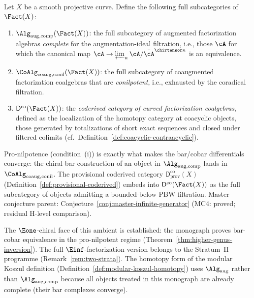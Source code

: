 \begin{definition}
\label{def:completed-chiral-ambient}
Let $X$ be a smooth projective curve.  Define the following full
subcategories of $\Fact(X)$:
\begin{enumerate}[label=\textup{(\roman*)}]
\item $\Alg_{\mathrm{aug,comp}}(\Fact(X))$: the full subcategory of
  augmented factorization algebras \emph{complete} for the
  augmentation-ideal filtration, i.e., those $\cA$ for which the
  canonical map
  $\cA \to \varprojlim_n \cA / \bar{\cA}^{\chirtensor n}$
  is an equivalence.
\item $\CoAlg_{\mathrm{coaug,conil}}(\Fact(X))$: the full subcategory
  of coaugmented factorization coalgebras that are \emph{conilpotent},
  i.e., exhausted by the coradical filtration.
\item $\mathsf{D}^{\mathrm{co}}(\Fact(X))$: the \emph{coderived
  category of curved factorization coalgebras}, defined as the
  localization of the homotopy category at coacyclic objects, those
  generated by totalizations of short exact sequences and closed under
  filtered colimits (cf.\
  Definition~\ref{def:coacyclic-contraacyclic}).
\end{enumerate}
Pro-nilpotence (condition~(i)) is exactly what makes the bar/cobar
differentials converge: the chiral bar construction of an object in
$\Alg_{\mathrm{aug,comp}}$ lands in $\CoAlg_{\mathrm{coaug,conil}}$.
The provisional coderived category
$\mathsf{D}^{\mathrm{co}}_{\mathrm{prov}}(X)$
(Definition~\ref{def:provisional-coderived}) embeds into
$\mathsf{D}^{\mathrm{co}}(\Fact(X))$
as the full subcategory of objects admitting a bounded-below PBW
filtration.
\textup{Master conjecture parent:}
Conjecture~\textup{\ref{conj:master-infinite-generator}} \textup{(MC4: proved; residual H-level comparison).}
\end{definition}

\begin{remark}[Status]\label{rem:completed-ambient-status}
The $\Eone$-chiral face of this ambient is established: the
monograph proves bar-cobar equivalence in the pro-nilpotent regime
(Theorem~\ref{thm:higher-genus-inversion}).  The full
$\Einf$-factorization version belongs to the Stratum~II programme
(Remark~\ref{rem:two-strata}).  The homotopy form of the modular
Koszul definition
(Definition~\ref{def:modular-koszul-homotopy}) uses
$\Alg_{\mathrm{aug}}$ rather than
$\Alg_{\mathrm{aug,comp}}$ because all objects treated in this
monograph are already complete (their bar complexes converge).
\end{remark}

